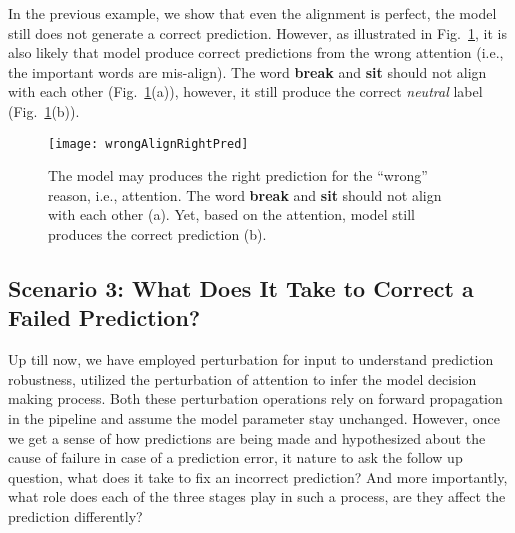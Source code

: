 In the previous example, we show that even the alignment is perfect, the model still does not generate a correct prediction.
However, as illustrated in Fig.~\ref{fig:wrongAlignRightPred}, it is also likely that model produce correct predictions from the wrong attention (i.e., the important words are mis-align). The word \textbf{break} and \textbf{sit} should not align with each other (Fig.~\ref{fig:wrongAlignRightPred}(a)), however, it still produce the correct \emph{neutral} label (Fig.~\ref{fig:wrongAlignRightPred}(b)).

\begin{figure}[htbp]
\centering
\vspace{-2mm}
 \texttt{[image: wrongAlignRightPred]}
 \caption{
The model may produces the right prediction for the ``wrong'' reason, i.e., attention.
The word \textbf{break} and \textbf{sit} should not align with each other (a). Yet, based on the attention, model still produces the correct prediction (b).
}
\label{fig:wrongAlignRightPred}
\end{figure}






\subsection{Scenario 3: What Does It Take to Correct a Failed Prediction?}
Up till now, we have employed perturbation for input to understand prediction robustness, utilized the perturbation of attention to infer the model decision making process. Both these perturbation operations rely on forward propagation in the pipeline and assume the model parameter stay unchanged.
%
However, once we get a sense of how predictions are being made and hypothesized about the cause of failure in case of a prediction error, it nature to ask the follow up question, what does it take to fix an incorrect prediction? And more importantly, what role does each of the three stages play in such a process, are they affect the prediction differently?

